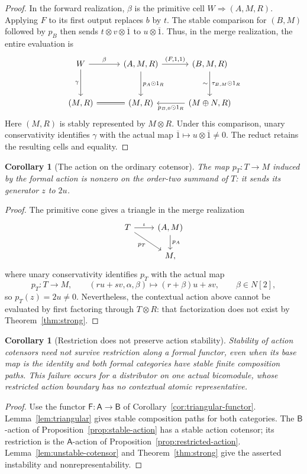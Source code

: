 \documentclass[11pt,a4paper]{article}
\newtheorem{corollary}[theorem]{Corollary}
\theoremstyle{definition}
\theoremstyle{remark}
\numberwithin{equation}{section}
\newcommand{\cell}{\mathrel{\Longrightarrow}}
\newcommand{\wh}{\mathbin{\odot}}
\begin{document}
\begin{proof}
In the forward realization, $\beta$ is the primitive cell
$W\cell(A,M,R)$. Applying $F$ to its first output replaces $b$ by $t$.
The stable comparison for $(B,M)$ followed by $p_B$ then sends
$t\otimes v\otimes\overline1$ to $u\otimes\overline1$. Thus, in the
merge realization, the entire evaluation is
\[
\begin{tikzcd}[column sep=2.8em,row sep=3em]
W \arrow[r,"\beta"] \arrow[d,"\gamma"'] &
(A,M,R) \arrow[r,"{(F,1,1)}"] \arrow[d,"p_A\wh1_R"] &
(B,M,R) \arrow[d,"\tau_{B,M}\wh1_R","\sim"']\\
(M,R) \arrow[r,equal] &
(M,R) &
(M\oplus N,R) \arrow[l,"p_{B,0}\wh1_R"]
\end{tikzcd}
\]
Here $(M,R)$ is stably represented by $M\otimes R$.
Under this comparison, unary conservativity identifies $\gamma$ with
the actual map $\overline1\mapsto u\otimes\overline1\neq0$.
The reduct retains the resulting cells and equality.
\end{proof}

\begin{corollary}[The action on the ordinary cotensor]\label{cor:ordinary-action}
The map $p_T:T\to M$ induced by the formal action is nonzero on the
order-two summand of $T$: it sends its generator $z$ to $2u$.
\end{corollary}
\begin{proof}
The primitive cone gives a triangle in the merge realization
\[
\begin{tikzcd}
T \arrow[r,"\iota"] \arrow[dr,"p_T"'] &
(A,M) \arrow[d,"p_A"]\\
& M,
\end{tikzcd}
\]
where unary conservativity identifies $p_T$ with the actual map
\[
p_T:T\longrightarrow M,\qquad
(ru+sv,\alpha,\beta)\longmapsto(r+\beta)u+sv,
\qquad \beta\in N[2],
\]
so $p_T(z)=2u\neq0$. Nevertheless, the contextual action above cannot
be evaluated by first factoring through $T\otimes R$: that
factorization does not exist by Theorem~\ref{thm:strong}.
\end{proof}

\begin{corollary}[Restriction does not preserve action stability]\label{cor:failure}
Stability of action cotensors need not survive restriction along a
formal functor, even when its base map is the identity and both formal
categories have stable finite composition paths. This failure occurs
for a distributor on one actual bicomodule, whose restricted action
boundary has no contextual atomic representative.
\end{corollary}
\begin{proof}
Use the functor $\mathsf F:\mathsf A\to\mathsf B$ of
Corollary~\ref{cor:triangular-functor}. Lemma~\ref{lem:triangular} gives
stable composition paths for both categories. The $\mathsf B$-action
of Proposition~\ref{prop:stable-action} has a stable action cotensor;
its restriction is the $\mathsf A$-action of
Proposition~\ref{prop:restricted-action}. Lemma~\ref{lem:unstable-cotensor}
and Theorem~\ref{thm:strong} give the asserted instability and
nonrepresentability.
\end{proof}
\end{document}
